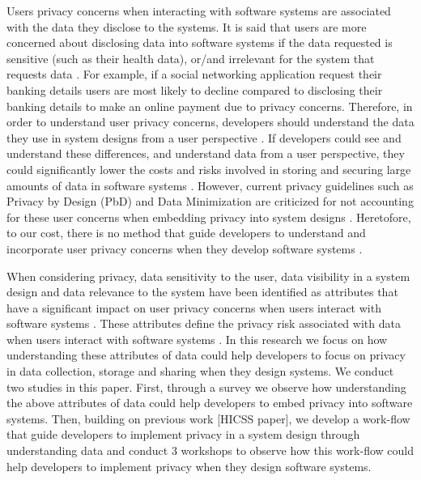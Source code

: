 \documentclass{sigchi}
\begin{document}
Users privacy concerns when interacting with software systems are associated with the data they disclose to the systems. It is said that users are more concerned about disclosing data into software systems if the data requested is sensitive (such as their health data), or/and irrelevant for the system that requests data \cite {malheiros2013fairly, malhotra2004internet}. For example, if a social networking application request their banking details users are most likely to decline compared to disclosing their banking details to make an online payment due to privacy concerns. Therefore, in order to understand user privacy concerns, developers should understand the data they use in system designs from a user perspective \cite {marr2015big, tene2012big}. If developers could see and understand these differences, and understand data from a user perspective, they could significantly lower the costs and risks involved in storing and securing large amounts of data in software systems \cite {marr2015big, tene2012big, rubinstein2012big}. However, current privacy guidelines such as Privacy by Design (PbD) and Data Minimization are criticized for not accounting for these user concerns when embedding privacy into system designs \cite {spiekermann2012challenges}. Heretofore, to our cost, there is no method that guide developers to understand and incorporate user privacy concerns when they develop software systems \cite {omoronyia2013engineering, thomas2014distilling, senarath2018understanding}.

When considering privacy, data sensitivity to the user, data visibility in a system design and data relevance to the system have been identified as attributes that have a significant impact on user privacy concerns when users interact with software systems \cite {malheiros2013fairly, malhotra2004internet}. These attributes define the privacy risk associated with data when users interact with software systems \cite {bansal2010impact, minkus2014scale, maximilien2009privacy}. In this research we focus on how understanding these attributes of data could help developers to focus on privacy in data collection, storage and sharing when they design systems. We conduct two studies in this paper. First, through a survey we observe how understanding the above attributes of data could help developers to embed privacy into software systems. Then, building on previous work [HICSS paper], we develop a work-flow that guide developers to implement privacy in a system design through understanding data and conduct 3 workshops to observe how this work-flow could help developers to implement privacy when they design software systems.
\end{document}
